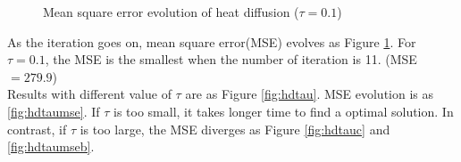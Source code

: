\documentclass[paper=a4, fontsize=11pt]{scrartcl} %
\numberwithin{equation}{section} %
\numberwithin{figure}{section} %
\numberwithin{table}{section} %
\begin{document}
\begin{figure}[H]
	\centering
	\noindent{}
\caption{Mean square error evolution of heat diffusion ($\tau = 0.1$) \label{hdmse}}
\end{figure}

As the iteration goes on, mean square error(MSE) evolves as Figure \ref{hdmse}. For $\tau = 0.1$, the MSE is the smallest when the number of iteration is 11. (MSE $= 279.9$) \\ 

Results with different value of $\tau$ are as Figure \ref{fig:hdtau}. MSE evolution is as \ref{fig:hdtaumse}. If $\tau$ is too small, it takes longer time to find a optimal solution. In contrast, if $\tau$ is too large, the MSE diverges as Figure \ref{fig:hdtauc} and \ref{fig:hdtaumseb}. 
\end{document}
